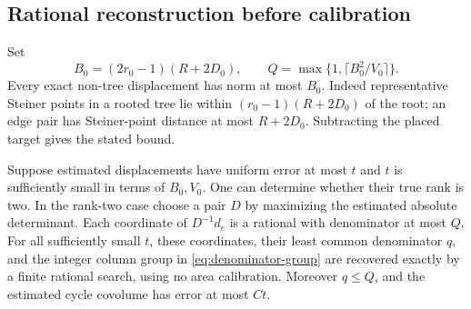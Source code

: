 \subsection{Rational reconstruction before calibration}
Set
\begin{equation}\label{eq:denominator-bound}
 B_0=(2r_0-1)(R+2D_0),\qquad
                  Q=\max\{1,\lceil B_0^2/V_0\rceil\}.
\end{equation}
Every exact non-tree displacement has norm at most $B_0$. Indeed
representative Steiner points in a rooted tree lie within
$(r_0-1)(R+2D_0)$ of the root; an edge pair has Steiner-point distance
at most $R+2D_0$. Subtracting the placed target gives the stated bound.

\begin{lemma}\label{lem:rational}
Suppose estimated displacements have uniform error at most $t$ and
$t$ is sufficiently small in terms of $B_0,V_0$. One can determine
whether their true rank is two. In the rank-two case choose a pair
$D$ by maximizing the estimated absolute determinant. Each coordinate
of $D^{-1}d_e$ is a rational with denominator at most $Q$. For all
sufficiently small $t$, these coordinates, their least common denominator
$q$, and the integer column group in \eqref{eq:denominator-group} are
recovered exactly by a finite rational search, using no area calibration.
Moreover $q\le Q$, and the estimated cycle covolume has error at most
$Ct$.
\end{lemma}
